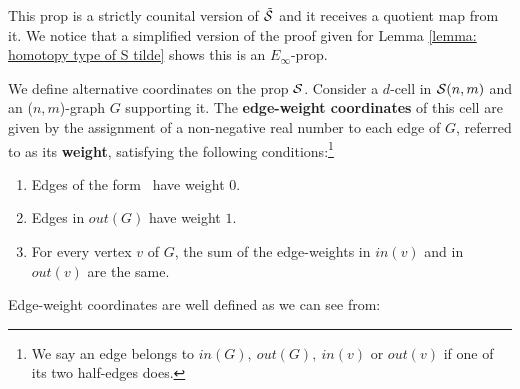 \begin{remark}
	This prop is a strictly counital version of $\tilde{\S}$ and it receives a quotient map from it. We notice that a simplified version of the proof given for Lemma \ref{lemma: homotopy type of S tilde} shows this is an $E_\infty$-prop.
\end{remark}

We define alternative coordinates on the prop $\S$.	Consider a $d$-cell in $\S(n,m)$ and an ($n,m$)-graph $G$ supporting it. The \textbf{edge-weight coordinates} of this cell are given by the assignment of a non-negative real number to each edge of $G$, referred to as its \textbf{weight}, satisfying the following conditions:\footnote{We say an edge belongs to $in(G),\ out(G),\ in(v)$ or $out(v)$ if one of its two half-edges does.} 
\begin{enumerate}
	\item Edges of the form \counit\ have weight $0$.
	\item Edges in $out(G)$ have weight $1$.
	\item For every vertex $v$ of $G$, the sum of the edge-weights in $in(v)$ and in $out(v)$ are the same.
\end{enumerate}
Edge-weight coordinates are well defined as we can see from:
